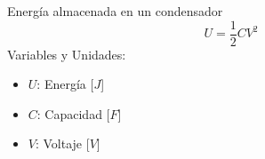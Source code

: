 \documentclass{article}
\begin{document}
\begin{multicols}{3}
\begin{teorema}{Energía almacenada en un condensador}
    $$U = \frac{1}{2} C V^2$$
    Variables y Unidades:
    \begin{itemize}
        \item $U$: Energía [$J$]
        \item $C$: Capacidad [$F$]
        \item $V$: Voltaje [$V$]
    \end{itemize}
\end{teorema}

\end{multicols}
\end{document}
